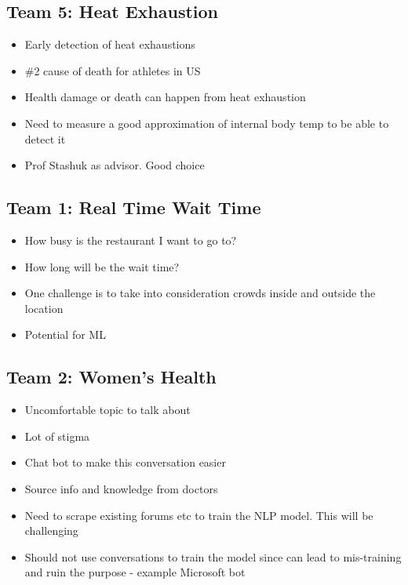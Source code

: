     \subsection{Team 5: Heat Exhaustion}
    \begin{itemize}
    		\item Early detection of heat exhaustions
    		\item \#2 cause of death for athletes in US
    		\item Health damage or death can happen from heat exhaustion
    		\item Need to measure a good approximation of internal body temp to be able to detect it
    		\item Prof Stashuk as advisor. Good choice
    \end{itemize}
    
        \subsection{Team 1: Real Time Wait Time}
    \begin{itemize}
    		\item How busy is the restaurant I want to go to?
    		\item How long will be the wait time?
    		\item One challenge is to take into consideration crowds inside and outside the location
    		\item Potential for ML
    \end{itemize}
    
        \subsection{Team 2: Women's Health}
    \begin{itemize}
    		\item Uncomfortable topic to talk about
    		\item Lot of stigma
    		\item Chat bot to make this conversation easier
    		\item Source info and knowledge from doctors
    		\item Need to scrape existing forums etc to train the NLP model. This will be challenging
    		\item Should not use conversations to train the model since can lead to mis-training and ruin the purpose - example Microsoft bot
    \end{itemize}
    
